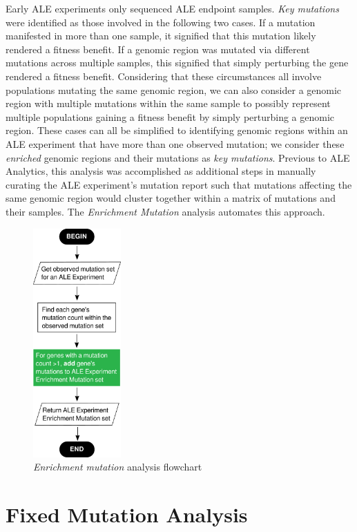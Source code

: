 \documentclass[12pt,final,masters,chapterheads]{ucsd}  %
\begin{document}
Early ALE experiments only sequenced ALE endpoint samples. \textit{Key mutations} were identified as those involved in the following two cases. If a mutation manifested in more than one sample, it signified that this mutation likely rendered a fitness benefit. If a genomic region was mutated via different mutations across multiple samples, this signified that simply perturbing the gene rendered a fitness benefit. Considering that these circumstances all involve populations mutating the same genomic region, we can also consider a genomic region with multiple mutations within the same sample to possibly represent multiple populations gaining a fitness benefit by simply perturbing a genomic region. These cases can all be simplified to identifying genomic regions within an ALE experiment that have more than one observed mutation; we consider these \textit{enriched} genomic regions and their mutations as \textit{key mutations}. Previous to ALE Analytics, this analysis was accomplished as additional steps in manually curating the ALE experiment's mutation report such that mutations affecting the same genomic region would cluster together within a matrix of mutations and their samples. The \textit{Enrichment Mutation} analysis automates this approach.

\begin{figure}[H]
  \caption{\textit{Enrichment mutation} analysis flowchart}
  \centering
  \includegraphics[width=0.3\textwidth]{enrichment_mutation_flowchart.png}
\end{figure}

\section{Fixed Mutation Analysis}
\end{document}
